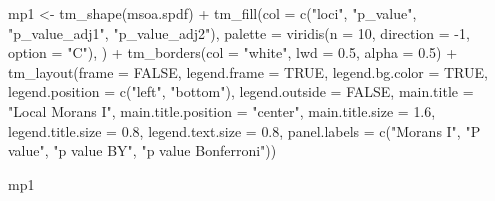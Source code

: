 \documentclass[
  letterpaper,
  DIV=11,
  numbers=noendperiod]{scrreprt}
\newenvironment{Shaded}{\begin{snugshade}}{\end{snugshade}}
\newcommand{\AttributeTok}[1]{\textcolor[rgb]{0.40,0.45,0.13}{#1}}
\newcommand{\ConstantTok}[1]{\textcolor[rgb]{0.56,0.35,0.01}{#1}}
\newcommand{\DecValTok}[1]{\textcolor[rgb]{0.68,0.00,0.00}{#1}}
\newcommand{\FloatTok}[1]{\textcolor[rgb]{0.68,0.00,0.00}{#1}}
\newcommand{\FunctionTok}[1]{\textcolor[rgb]{0.28,0.35,0.67}{#1}}
\newcommand{\NormalTok}[1]{\textcolor[rgb]{0.00,0.23,0.31}{#1}}
\newcommand{\OtherTok}[1]{\textcolor[rgb]{0.00,0.23,0.31}{#1}}
\newcommand{\SpecialCharTok}[1]{\textcolor[rgb]{0.37,0.37,0.37}{#1}}
\newcommand{\StringTok}[1]{\textcolor[rgb]{0.13,0.47,0.30}{#1}}
\begin{document}
\begin{Shaded}
\begin{Highlighting}[]
\NormalTok{mp1 }\OtherTok{\textless{}{-}}  \FunctionTok{tm\_shape}\NormalTok{(msoa.spdf) }\SpecialCharTok{+} 
  \FunctionTok{tm\_fill}\NormalTok{(}\AttributeTok{col =} \FunctionTok{c}\NormalTok{(}\StringTok{"loci"}\NormalTok{, }\StringTok{"p\_value"}\NormalTok{, }\StringTok{"p\_value\_adj1"}\NormalTok{, }\StringTok{"p\_value\_adj2"}\NormalTok{),}
          \AttributeTok{palette =} \FunctionTok{viridis}\NormalTok{(}\AttributeTok{n =} \DecValTok{10}\NormalTok{, }\AttributeTok{direction =} \SpecialCharTok{{-}}\DecValTok{1}\NormalTok{, }\AttributeTok{option =} \StringTok{"C"}\NormalTok{),}
\NormalTok{          ) }\SpecialCharTok{+}
  \FunctionTok{tm\_borders}\NormalTok{(}\AttributeTok{col =} \StringTok{"white"}\NormalTok{, }\AttributeTok{lwd =} \FloatTok{0.5}\NormalTok{, }\AttributeTok{alpha =} \FloatTok{0.5}\NormalTok{) }\SpecialCharTok{+}
  \FunctionTok{tm\_layout}\NormalTok{(}\AttributeTok{frame =} \ConstantTok{FALSE}\NormalTok{,}
            \AttributeTok{legend.frame =} \ConstantTok{TRUE}\NormalTok{, }\AttributeTok{legend.bg.color =} \ConstantTok{TRUE}\NormalTok{,}
            \AttributeTok{legend.position =} \FunctionTok{c}\NormalTok{(}\StringTok{"left"}\NormalTok{, }\StringTok{"bottom"}\NormalTok{),}
            \AttributeTok{legend.outside =} \ConstantTok{FALSE}\NormalTok{,}
            \AttributeTok{main.title =} \StringTok{"Local Morans I"}\NormalTok{, }
            \AttributeTok{main.title.position =} \StringTok{"center"}\NormalTok{,}
            \AttributeTok{main.title.size =} \FloatTok{1.6}\NormalTok{,}
            \AttributeTok{legend.title.size =} \FloatTok{0.8}\NormalTok{,}
            \AttributeTok{legend.text.size =} \FloatTok{0.8}\NormalTok{,}
            \AttributeTok{panel.labels =} \FunctionTok{c}\NormalTok{(}\StringTok{"Morans I"}\NormalTok{,}
                               \StringTok{"P value"}\NormalTok{,}
                               \StringTok{"p value BY"}\NormalTok{,}
                             \StringTok{"p value Bonferroni"}\NormalTok{))}

\NormalTok{mp1}
\end{Highlighting}
\end{Shaded}
\end{document}
